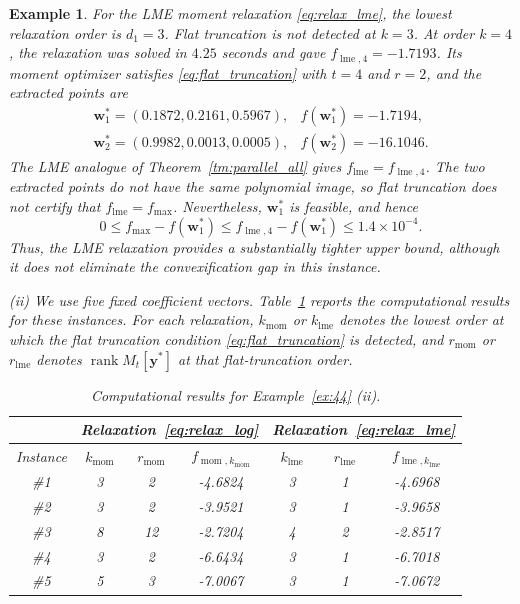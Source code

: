 \documentclass[pdflatex,sn-mathphys-num]{sn-jnl}%
\newcommand{\vect}[1]{\boldsymbol{#1}}
\theoremstyle{thmstyleone}%
\theoremstyle{thmstyletwo}%
\newtheorem{example}{Example}%
\theoremstyle{thmstylethree}%
\begin{document}
\begin{example}
{	For the LME moment relaxation \eqref{eq:relax_lme}, the lowest
	relaxation order is $d_1=3$. Flat truncation is not detected at
	$k=3$. At order $k=4$, the relaxation was solved in $4.25$ seconds
	and gave $f_{\operatorname{lme},4}=-1.7193$. Its moment optimizer
	satisfies \eqref{eq:flat_truncation} with $t=4$ and $r=2$, and the
	extracted points are
	\[
	\begin{array}{ll}
	\vect{w}_1^*=(0.1872,0.2161,0.5967),
	& f(\vect{w}_1^*)=-1.7194,\\
	\vect{w}_2^*=(0.9982,0.0013,0.0005),
	& f(\vect{w}_2^*)=-16.1046.
	\end{array}
	\]
	The LME analogue of Theorem~\ref{tm:parallel_all} gives
	$f_{\operatorname{lme}}=f_{\operatorname{lme},4}$. The two extracted
	points do not have the same polynomial image, so flat truncation does
	not certify that $f_{\operatorname{lme}}=f_{\max}$. Nevertheless,
	$\vect{w}_1^*$ is feasible, and hence
	\[
	0\leq f_{\max}-f(\vect{w}_1^*)
	\leq f_{\operatorname{lme},4}-f(\vect{w}_1^*)
	\leq 1.4\times10^{-4}.
	\]
	Thus, the LME relaxation provides a substantially tighter upper
	bound, although it does not eliminate the convexification gap in
	this instance.
}
	
	
	
\clearpage
{\color{red}
	(ii) We use five fixed coefficient vectors.
	Table~\ref{tab:ex:44} reports the computational results for these
	instances. For each relaxation, $k_{\operatorname{mom}}$ or
	$k_{\operatorname{lme}}$ denotes the lowest order at which the flat
	truncation condition \eqref{eq:flat_truncation} is detected, and
	$r_{\operatorname{mom}}$ or $r_{\operatorname{lme}}$ denotes
	$\operatorname{rank}M_t[\vect{y}^*]$ at that flat-truncation order.
}

	\begin{table}[!h]
		\centering
		\caption{Computational results for Example~\ref{ex:44} (ii).}
        \label{tab:ex:44}
\begin{tabular}{|c|c|c|c|c|c|c|}
\hline
& \multicolumn{3}{c|}{Relaxation~\eqref{eq:relax_log}}
& \multicolumn{3}{c|}{Relaxation~\eqref{eq:relax_lme}}\\
\hline
Instance
& $k_{\operatorname{mom}}$
& $r_{\operatorname{mom}}$
& $f_{\operatorname{mom},k_{\operatorname{mom}}}$
& $k_{\operatorname{lme}}$
& $r_{\operatorname{lme}}$
& $f_{\operatorname{lme},k_{\operatorname{lme}}}$\\
\hline
\#1 & 3 & 2  & -4.6824 & 3 & 1 & -4.6968\\
\hline
\#2 & 3 & 2  & -3.9521 & 3 & 1 & -3.9658\\
\hline
\#3 & 8 & 12 & -2.7204 & 4 & 2 & -2.8517\\
\hline
\#4 & 3 & 2  & -6.6434 & 3 & 1 & -6.7018\\
\hline
\#5 & 5 & 3  & -7.0067 & 3 & 1 & -7.0672\\
\hline
\end{tabular}
	\end{table}


\end{example}
\end{document}
